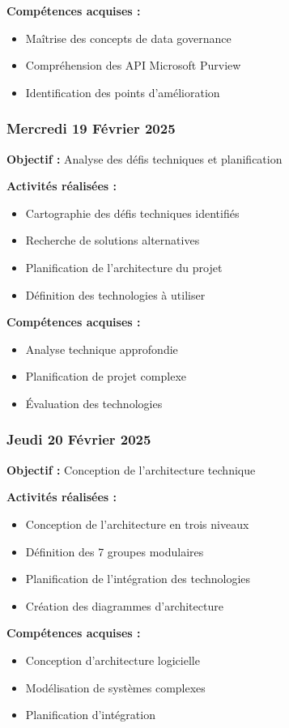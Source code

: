 \documentclass[12pt,a4paper]{article}
\begin{document}
\textbf{Compétences acquises :}
\begin{itemize}
    \item Maîtrise des concepts de data governance
    \item Compréhension des API Microsoft Purview
    \item Identification des points d'amélioration
\end{itemize}

\subsubsection{Mercredi 19 Février 2025}
\textbf{Objectif :} Analyse des défis techniques et planification

\textbf{Activités réalisées :}
\begin{itemize}
    \item Cartographie des défis techniques identifiés
    \item Recherche de solutions alternatives
    \item Planification de l'architecture du projet
    \item Définition des technologies à utiliser
\end{itemize}

\textbf{Compétences acquises :}
\begin{itemize}
    \item Analyse technique approfondie
    \item Planification de projet complexe
    \item Évaluation des technologies
\end{itemize}

\subsubsection{Jeudi 20 Février 2025}
\textbf{Objectif :} Conception de l'architecture technique

\textbf{Activités réalisées :}
\begin{itemize}
    \item Conception de l'architecture en trois niveaux
    \item Définition des 7 groupes modulaires
    \item Planification de l'intégration des technologies
    \item Création des diagrammes d'architecture
\end{itemize}

\textbf{Compétences acquises :}
\begin{itemize}
    \item Conception d'architecture logicielle
    \item Modélisation de systèmes complexes
    \item Planification d'intégration
\end{itemize}
\end{document}
